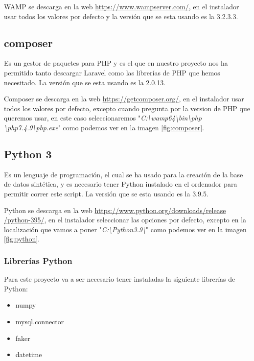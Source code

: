 WAMP se descarga en la web \href{https://www.wampserver.com/}{https://www.wampserver.com/}, en el instalador usar todos los valores por defecto y la versión que se esta usando es la 3.2.3.3.

\subsection{composer}

Es un gestor de paquetes para PHP y es el que en nuestro proyecto nos ha permitido tanto descargar Laravel como las librerías de PHP que hemos necesitado. La versión que se esta usando es la 2.0.13.

Composer se descarga en la web \href{https://getcomposer.org/}{https://getcomposer.org/}, en el instalador usar todos los valores por defecto, excepto cuando pregunta por la version de PHP que queremos usar, en este caso seleccionaremos "\textit{C:\textbackslash{}wamp64\textbackslash{}bin\textbackslash{}php\\\textbackslash{}php7.4.9\textbackslash{}php.exe}" como podemos ver en la imagen \ref{fig:composer}.


\subsection{Python 3}

Es un lenguaje de programación, el cual se ha usado para la creación de la base de datos sintética, y es necesario tener Python instalado en el ordenador para permitir correr este script. La versión que se esta usando es la 3.9.5.

Python se descarga en la web \href{https://www.python.org/downloads/release/python-395/}{https://www.python.org/downloads/release\\/python-395/}, en el instalador seleccionar las opciones por defecto, excepto en la localización que vamos a poner "\textit{C:\textbackslash{}Python3.9\textbackslash{}}" como podemos ver en la imagen \ref{fig:python}.

\newpage

\subsubsection{Librerías Python}

Para este proyecto va a ser necesario tener instaladas la siguiente librerías de Python:
\begin{itemize}
    \item numpy
    \item mysql.connector
    \item faker
    \item datetime
\end{itemize}

